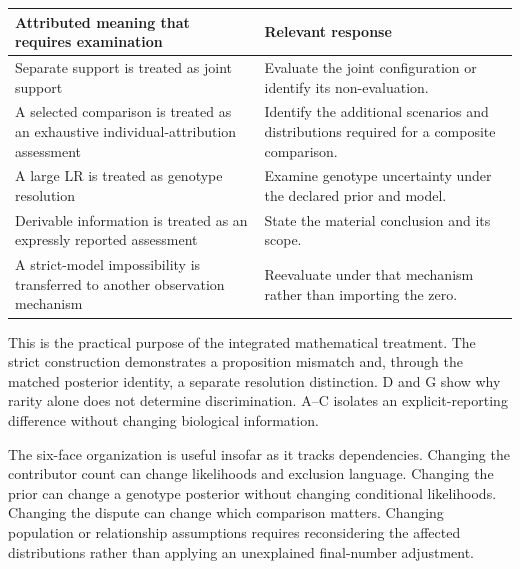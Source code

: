 \documentclass[
]{article}
\newcounter{none} %
\begin{document}
{\def\LTcaptype{none} %
\begin{longtable}[]{@{}
  >{\raggedright\arraybackslash}p{}
  >{\raggedright\arraybackslash}p{}@{}}
\toprule\noalign{}
\begin{minipage}[b]{\linewidth}\raggedright
Attributed meaning that requires examination
\end{minipage} & \begin{minipage}[b]{\linewidth}\raggedright
Relevant response
\end{minipage} \\
\midrule\noalign{}
\endhead
\bottomrule\noalign{}
\endlastfoot
Separate support is treated as joint support & Evaluate the joint
configuration or identify its non-evaluation. \\
A selected comparison is treated as an exhaustive individual-attribution
assessment & Identify the additional scenarios and distributions
required for a composite comparison. \\
A large LR is treated as genotype resolution & Examine genotype
uncertainty under the declared prior and model. \\
Derivable information is treated as an expressly reported assessment &
State the material conclusion and its scope. \\
A strict-model impossibility is transferred to another observation
mechanism & Reevaluate under that mechanism rather than importing the
zero. \\
\end{longtable}
}

This is the practical purpose of the integrated mathematical treatment.
The strict construction demonstrates a proposition mismatch and, through
the matched posterior identity, a separate resolution distinction. D and
G show why rarity alone does not determine discrimination. A--C isolates
an explicit-reporting difference without changing biological
information.

The six-face organization is useful insofar as it tracks dependencies.
Changing the contributor count can change likelihoods and exclusion
language. Changing the prior can change a genotype posterior without
changing conditional likelihoods. Changing the dispute can change which
comparison matters. Changing population or relationship assumptions
requires reconsidering the affected distributions rather than applying
an unexplained final-number adjustment.
\end{document}
